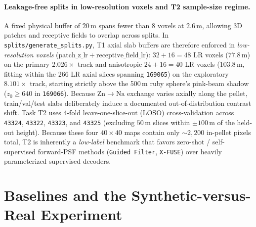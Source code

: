 \documentclass[10pt]{article}
\begin{document}
\paragraph{Leakage-free splits in low-resolution voxels and T2 sample-size regime.}
A fixed physical buffer of $20$\,\textmu m spans fewer than 8 voxels at $2.6$\,\textmu m, allowing 3D patches and receptive fields to overlap across splits. In \texttt{splits/generate\_splits.py}, T1 axial slab buffers are therefore enforced in \emph{low-resolution voxels} ($\mathrm{patch\_z\_lr} + \mathrm{receptive\_field\_lr}$): $32 + 16 = 48$ LR voxels ($77.8$\,\textmu m) on the primary $2.026\times$ track and anisotropic $24 + 16 = 40$ LR voxels ($103.8$\,\textmu m, fitting within the 266 LR axial slices spanning \texttt{169065}) on the exploratory $8.101\times$ track, starting strictly above the 500\,\textmu m ruby sphere's pink-beam shadow ($z_0 \ge 640$ in \texttt{169066}). Because $\mathrm{Zn \to Na}$ exchange varies axially along the pellet, train/val/test slabs deliberately induce a documented out-of-distribution contrast shift. Task T2 uses 4-fold leave-one-slice-out (LOSO) cross-validation across \texttt{43324}, \texttt{43322}, \texttt{43323}, and \texttt{43325} (excluding $50$\,\textmu m slices within $\pm 100$\,\textmu m of the held-out height). Because these four $40 \times 40$ maps contain only $\sim 2{,}200$ in-pellet pixels total, T2 is inherently a \emph{low-label} benchmark that favors zero-shot / self-supervised forward-PSF methods (\texttt{Guided Filter}, \texttt{X-FUSE}) over heavily parameterized supervised decoders.

\section{Baselines and the Synthetic-versus-Real Experiment}
\label{sec:baselines}
\end{document}
